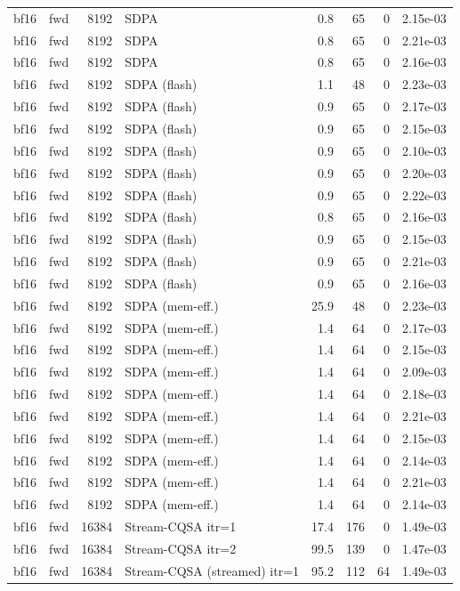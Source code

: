 \begin{tabular}{llrlrrrl}
bf16 & fwd & 8192 & SDPA & 0.8 & 65 & 0 & 2.15e-03 \\
bf16 & fwd & 8192 & SDPA & 0.8 & 65 & 0 & 2.21e-03 \\
bf16 & fwd & 8192 & SDPA & 0.8 & 65 & 0 & 2.16e-03 \\
bf16 & fwd & 8192 & SDPA (flash) & 1.1 & 48 & 0 & 2.23e-03 \\
bf16 & fwd & 8192 & SDPA (flash) & 0.9 & 65 & 0 & 2.17e-03 \\
bf16 & fwd & 8192 & SDPA (flash) & 0.9 & 65 & 0 & 2.15e-03 \\
bf16 & fwd & 8192 & SDPA (flash) & 0.9 & 65 & 0 & 2.10e-03 \\
bf16 & fwd & 8192 & SDPA (flash) & 0.9 & 65 & 0 & 2.20e-03 \\
bf16 & fwd & 8192 & SDPA (flash) & 0.9 & 65 & 0 & 2.22e-03 \\
bf16 & fwd & 8192 & SDPA (flash) & 0.8 & 65 & 0 & 2.16e-03 \\
bf16 & fwd & 8192 & SDPA (flash) & 0.9 & 65 & 0 & 2.15e-03 \\
bf16 & fwd & 8192 & SDPA (flash) & 0.9 & 65 & 0 & 2.21e-03 \\
bf16 & fwd & 8192 & SDPA (flash) & 0.9 & 65 & 0 & 2.16e-03 \\
bf16 & fwd & 8192 & SDPA (mem-eff.) & 25.9 & 48 & 0 & 2.23e-03 \\
bf16 & fwd & 8192 & SDPA (mem-eff.) & 1.4 & 64 & 0 & 2.17e-03 \\
bf16 & fwd & 8192 & SDPA (mem-eff.) & 1.4 & 64 & 0 & 2.15e-03 \\
bf16 & fwd & 8192 & SDPA (mem-eff.) & 1.4 & 64 & 0 & 2.09e-03 \\
bf16 & fwd & 8192 & SDPA (mem-eff.) & 1.4 & 64 & 0 & 2.18e-03 \\
bf16 & fwd & 8192 & SDPA (mem-eff.) & 1.4 & 64 & 0 & 2.21e-03 \\
bf16 & fwd & 8192 & SDPA (mem-eff.) & 1.4 & 64 & 0 & 2.15e-03 \\
bf16 & fwd & 8192 & SDPA (mem-eff.) & 1.4 & 64 & 0 & 2.14e-03 \\
bf16 & fwd & 8192 & SDPA (mem-eff.) & 1.4 & 64 & 0 & 2.21e-03 \\
bf16 & fwd & 8192 & SDPA (mem-eff.) & 1.4 & 64 & 0 & 2.14e-03 \\
bf16 & fwd & 16384 & Stream-CQSA itr=1 & 17.4 & 176 & 0 & 1.49e-03 \\
bf16 & fwd & 16384 & Stream-CQSA itr=2 & 99.5 & 139 & 0 & 1.47e-03 \\
bf16 & fwd & 16384 & Stream-CQSA (streamed) itr=1 & 95.2 & 112 & 64 & 1.49e-03 \\

\end{tabular}
